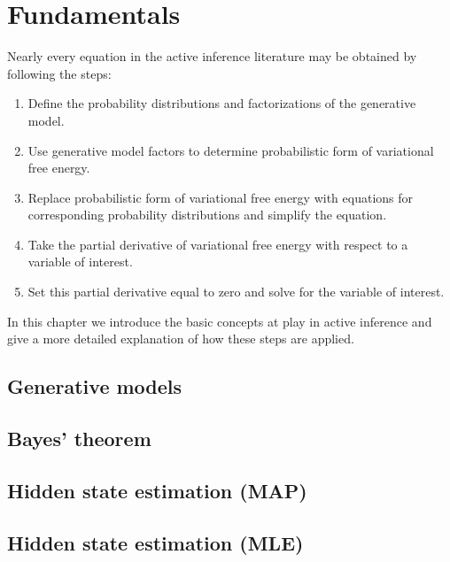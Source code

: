 \chapter{Fundamentals}

Nearly every equation in the active inference literature may be obtained by following the steps:

\begin{enumerate}
    \item Define the probability distributions and factorizations of the generative model.
    \item Use generative model factors to determine probabilistic form of variational free energy.
    \item Replace probabilistic form of variational free energy with equations for corresponding probability distributions and simplify the equation.
    \item Take the partial derivative of variational free energy with respect to a variable of interest.
    \item Set this partial derivative equal to zero and solve for the variable of interest.
\end{enumerate}

In this chapter we introduce the basic concepts at play in active inference and give a more detailed explanation of how these steps are applied.

\section{Generative models}
\section{Bayes' theorem}
\section{Hidden state estimation (MAP)}
\section{Hidden state estimation (MLE)}
